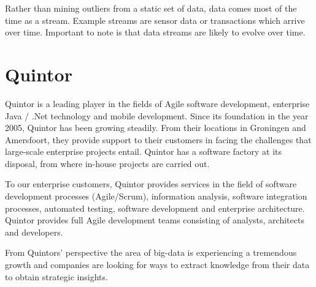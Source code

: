 Rather than mining outliers from a static set of data, data comes most of the time as a stream. Example streams are sensor data or transactions which arrive over time. Important to note is that data streams are likely to evolve over time.

\section{Quintor \label{sec1-Quintor}}
Quintor is a leading player in the fields of Agile software development, enterprise Java / .Net technology and mobile development. Since its foundation in the year 2005, Quintor has been growing steadily. From their locations in Groningen and Amersfoort, they provide support to their customers in facing the challenges that large-scale enterprise projects entail. Quintor has a software factory at its disposal, from where in-house projects are carried out. 

To our enterprise customers, Quintor provides services in the field of software development processes (Agile/Scrum), information analysis, software integration processes, automated testing, software development and enterprise architecture. Quintor provides full Agile development teams consisting of analysts, architects and developers.

From Quintors' perspective the area of big-data is experiencing a tremendous growth and companies are looking for ways to extract knowledge from their data to obtain strategic insights.
